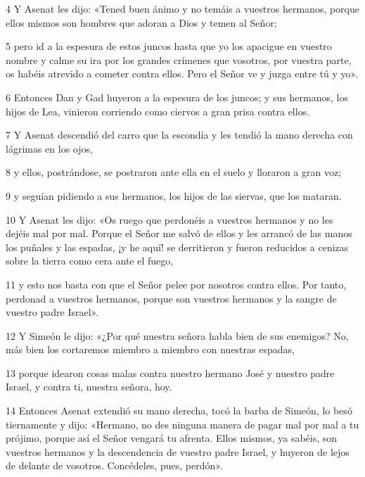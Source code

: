 \par 4 Y Asenat les dijo: «Tened buen ánimo y no temáis a vuestros hermanos, porque ellos mismos son hombres que adoran a Dios y temen al Señor;

\par 5 pero id a la espesura de estos juncos hasta que yo los apacigue en vuestro nombre y calme su ira por los grandes crímenes que vosotros, por vuestra parte, os habéis atrevido a cometer contra ellos. Pero el Señor ve y juzga entre tú y yo».

\par 6 Entonces Dan y Gad huyeron a la espesura de los juncos; y sus hermanos, los hijos de Lea, vinieron corriendo como ciervos a gran prisa contra ellos.

\par 7 Y Asenat descendió del carro que la escondía y les tendió la mano derecha con lágrimas en los ojos,

\par 8 y ellos, postrándose, se postraron ante ella en el suelo y lloraron a gran voz;

\par 9 y seguían pidiendo a sus hermanos, los hijos de las siervas, que los mataran.

\par 10 Y Asenat les dijo: «Os ruego que perdonéis a vuestros hermanos y no les dejéis mal por mal. Porque el Señor me salvó de ellos y les arrancó de las manos los puñales y las espadas, ¡y he aquí! se derritieron y fueron reducidos a cenizas sobre la tierra como cera ante el fuego,

\par 11 y esto nos basta con que el Señor pelee por nosotros contra ellos. Por tanto, perdonad a vuestros hermanos, porque son vuestros hermanos y la sangre de vuestro padre Israel».

\par 12 Y Simeón le dijo: «¿Por qué nuestra señora habla bien de sus enemigos? No, más bien los cortaremos miembro a miembro con nuestras espadas,

\par 13 porque idearon cosas malas contra nuestro hermano José y nuestro padre Israel, y contra ti, nuestra señora, hoy.

\par 14 Entonces Asenat extendió su mano derecha, tocó la barba de Simeón, lo besó tiernamente y dijo: «Hermano, no des ninguna manera de pagar mal por mal a tu prójimo, porque así el Señor vengará tu afrenta. Ellos mismos, ya sabéis, son vuestros hermanos y la descendencia de vuestro padre Israel, y huyeron de lejos de delante de vosotros. Concédeles, pues, perdón».

